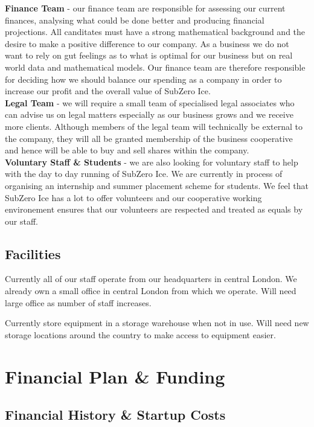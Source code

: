 \documentclass{article}
\begin{document}
{\bf Finance Team} - our finance team are responsible for assessing our current finances, analysing what could be done better and producing financial projections. All canditates must have a strong mathematical background and the desire to make a positive difference to our company. As a business we do not want to rely on gut feelings as to what is optimal for our business but on real world data and mathematical models. Our finance team are therefore responsible for deciding how we should balance our spending as a company in order to increase our profit and the overall value of SubZero Ice. \\

{\bf Legal Team} - we will require a small team of specialised legal associates who can advise us on legal matters especially as our business grows and we receive more clients. Although members of the legal team will technically be external to the company, they will all be granted membership of the business cooperative and hence will be able to buy and sell shares within the company. \\

{\bf Voluntary Staff \& Students} - we are also looking for voluntary staff to help with the day to day running of SubZero Ice. We are currently in process of organising an internship and summer placement scheme for students. We feel that SubZero Ice has a lot to offer volunteers and our cooperative working environement ensures that our volunteers are respected and treated as equals by our staff.


  \subsection{Facilities}

  Currently all of our staff operate from our headquarters in central London.
  We already own a small office in central London from which we operate.
  Will need large office as number of staff increases.

  Currently store equipment in a storage warehouse when not in use.
  Will need new storage locations around the country to make access to equipment easier.


\section{Financial Plan \& Funding}

\subsection{Financial History \& Startup Costs}
\end{document}
